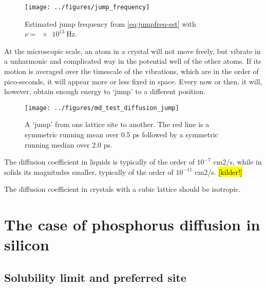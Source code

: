 \documentclass[11pt,bibliography=totoc,index=totoc]{scrbook}   %
\newcommand{\comment}[1]{\hl{#1}}
\begin{document}
\begin{figure}[htbp]
  \begin{center}
    \texttt{[image: ../figures/jump\_frequency]}
  \end{center}
  \caption{Estimated jump frequency from \eqref{eq:jumpfreq-est} with $\nu=\SI{e13}{\hertz}$.}
  \label{fig:jumpfreq-est}
\end{figure}




At the microscopic scale, an atom in a crystal will not move freely, but vibrate in a unharmonic and complicated way in the potential well of the other atoms. 
If its motion is averaged over the timescale of the vibrations, which are in the order of pico-seconds, it will appear more or less fixed in space. 
Every now or then, it will, however, obtain enough energy to `jump' to a different position.

\begin{figure}[htbp]
  \begin{center}
    \texttt{[image: ../figures/md\_test\_diffusion\_jump]}
  \end{center}
  \caption{A `jump' from one lattice site to another. The red line is a symmetric running mean over 0.5 ps followed by a symmetric running median over 2.0 ps.}
  \label{fig:../figures/md_test_diffusion_jump}
\end{figure}

The diffusion coefficient in liquids is typically of the order of $10^{-7}$ cm2/s,
while in solids its magnitudes smaller, typically of the order of $10^{-11}$ cm2/s. \comment{[kilder!]}


The diffusion coefficient in crystals with a cubic lattice should be isotropic.

%
\section{The case of phosphorus diffusion in silicon}\label{sec:P}
%

%
\subsection{Solubility limit and preferred site}\label{sec:PSolubility}
%
\end{document}
